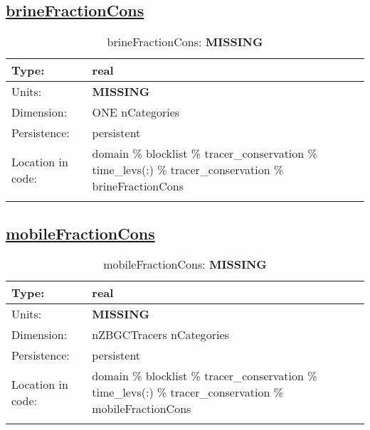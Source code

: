 \subsection[brineFractionCons]{\hyperref[sec:var_tab_tracer_conservation]{brineFractionCons}}
\label{subsec:var_sec_tracer_conservation_brineFractionCons}
\begin{center}
\begin{longtable}{| p{2.0in} | p{4.0in} |}
        \hline 
        Type: & real \\
        \hline 
        Units: & {\bf \color{red} MISSING} \\
        \hline 
        Dimension: & ONE nCategories \\
        \hline 
        Persistence: & persistent \\
        \hline 
         Location in code: & domain \% blocklist \% tracer\_conservation \% time\_levs(:) \% tracer\_conservation \% brineFractionCons \\
         \hline 
    \caption{brineFractionCons: {\bf \color{red} MISSING}}
\end{longtable}
\end{center}
\subsection[mobileFractionCons]{\hyperref[sec:var_tab_tracer_conservation]{mobileFractionCons}}
\label{subsec:var_sec_tracer_conservation_mobileFractionCons}
\begin{center}
\begin{longtable}{| p{2.0in} | p{4.0in} |}
        \hline 
        Type: & real \\
        \hline 
        Units: & {\bf \color{red} MISSING} \\
        \hline 
        Dimension: & nZBGCTracers nCategories \\
        \hline 
        Persistence: & persistent \\
        \hline 
         Location in code: & domain \% blocklist \% tracer\_conservation \% time\_levs(:) \% tracer\_conservation \% mobileFractionCons \\
         \hline 
    \caption{mobileFractionCons: {\bf \color{red} MISSING}}
\end{longtable}
\end{center}
